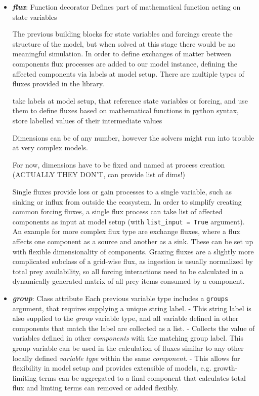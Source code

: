 \documentclass[journal abbreviation, manuscript]{copernicus}
\begin{document}
\begin{itemize}
    \item \textbf{\textit{flux}}: Function decorator
    Defines part of mathematical function acting on state variables
    
    The previous building blocks for state variables and forcings create the structure of the model, but when solved at this stage there would be no meaningful simulation. In order to define exchanges of matter between components flux processes are added to our model instance, defining the affected components via labels at model setup.
    There are multiple types of fluxes provided in the library. 

    take labels at model setup, that reference state variables or forcing, and use them to define fluxes based on mathematical functions in python syntax, store labelled values of their intermediate values

    Dimensions can be of any number, however the solvers might run into trouble at very complex models. 

    For now, dimensions have to be fixed and named at process creation (ACTUALLY THEY DON'T, can provide list of dims!)

    Single fluxes provide loss or gain processes to a single variable, such as sinking or influx from outside the ecosystem. In order to simplify creating common forcing fluxes, a single flux process can take list of affected components as input at model setup (with \texttt{list\_input = True} argument). An example for more complex flux type are exchange fluxes, where a flux affects one component as a source and another as a sink. These can be set up with flexible dimensionality of components. Grazing fluxes are a slightly more complicated subclass of a grid-wise flux, as ingestion is usually normalized by total prey availability, so all forcing interactions need to be calculated in a dynamically generated matrix of all prey items consumed by a component.
    
    \item \textbf{\textit{group}}: Class attribute
    Each previous variable type includes a \texttt{groups} argument, that requires supplying a unique string label. 
    - This string label is also supplied to the \textit{group} variable type, and all variable defined in other components that match the label are collected as a list. 
    - Collects the value of variables defined in other \textit{components} with the matching group label. This group variable can be used in the calculation of fluxes similar to any other locally defined \textit{variable type} within the same \textit{component}.
    - This allows for flexibility in model setup and provides extensible of models, e.g. growth-limiting terms can be aggregated to a final component that calculates total flux and limting terms can removed or added flexibly.
    
\end{itemize}
\end{document}
